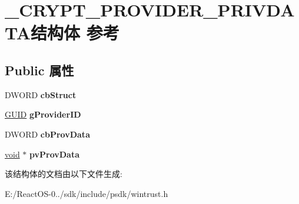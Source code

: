 \hypertarget{struct___c_r_y_p_t___p_r_o_v_i_d_e_r___p_r_i_v_d_a_t_a}{}\section{\+\_\+\+C\+R\+Y\+P\+T\+\_\+\+P\+R\+O\+V\+I\+D\+E\+R\+\_\+\+P\+R\+I\+V\+D\+A\+T\+A结构体 参考}
\label{struct___c_r_y_p_t___p_r_o_v_i_d_e_r___p_r_i_v_d_a_t_a}
\subsection*{Public 属性}
\begin{DoxyCompactItemize}
\item 
\mbox{\label{struct___c_r_y_p_t___p_r_o_v_i_d_e_r___p_r_i_v_d_a_t_a_a46777f1bfa96ab9c33012221113e960e}} 
D\+W\+O\+RD {\bfseries cb\+Struct}
\item 
\mbox{\label{struct___c_r_y_p_t___p_r_o_v_i_d_e_r___p_r_i_v_d_a_t_a_a1c73fc9b9579c6774724a97a54bbfe25}} 
\hyperlink{interface_g_u_i_d}{G\+U\+ID} {\bfseries g\+Provider\+ID}
\item 
\mbox{\label{struct___c_r_y_p_t___p_r_o_v_i_d_e_r___p_r_i_v_d_a_t_a_af236b483dd904ade23fd4d448b8f70fb}} 
D\+W\+O\+RD {\bfseries cb\+Prov\+Data}
\item 
\mbox{\label{struct___c_r_y_p_t___p_r_o_v_i_d_e_r___p_r_i_v_d_a_t_a_a3126a0b5bd1c528cb5f9b8b92c011216}} 
\hyperlink{interfacevoid}{void} $\ast$ {\bfseries pv\+Prov\+Data}
\end{DoxyCompactItemize}


该结构体的文档由以下文件生成\+:\begin{DoxyCompactItemize}
\item 
E\+:/\+React\+O\+S-\/0../sdk/include/psdk/wintrust.\+h\end{DoxyCompactItemize}
